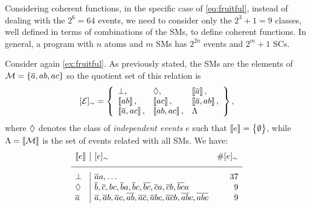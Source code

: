 \documentclass[x11names]{tlp}
\begin{document}
Considering coherent functions, in the specific case of \cref{eq:fruitful},
instead of dealing with the $2^6 = 64$ events, we need to consider only the
$2^3 + 1 = 9$ classes, well defined in terms of combinations of the
\aclp{SM}, to define coherent functions. In general, a program with $n$ atoms
and $m$ \aclp{SM} has $2^{2n}$ events and $2^m + 1$ \aclp{SC}.

\ifExamples
	\begin{example}\label{ex:classes}\em

		Consider again \cref{ex:fruitful}. As previously stated, the \aclp{SM} are
		the elements of $\MODELset = \set{\co{a}, ab, ac}$ so the quotient set of
		this relation is
		\begin{equation*}
			\class{\EVENTSset} = \set{
				\begin{array}{lll}
					\inconsistent,           &
					\indepclass,             &
					\stablecore{\co{a}},%
					\\
					\stablecore{ab},         &
					\stablecore{ac},         &
					\stablecore{\co{a}, ab},%
					\\
					\stablecore{\co{a}, ac}, &
					\stablecore{ab, ac},     &
					\consequenceclass
				\end{array}
			},
		\end{equation*}
		where $\Diamond$ denotes the class of \emph{independent
			events} $e$ such that $\left\llbracket e \right\rrbracket = \set{\emptyset}$,
		while $\consequenceclass = \stablecore{\MODELset}$ is the set of
		events related with all \acp{SM}.  We have:
		\begin{equation*}
			\begin{array}{l|lr}
				\stablecore{e}
				       & \class{e}
				       & \# \class{e}                                                                           %
				\\
				\hline
				\inconsistent
				       & \co{a}a, \ldots
				       & 37                                                                                     %
				\\
				\indepclass
				       & \co{b}, \co{c}, bc, \co{b}a, \co{b}c, \co{bc}, \co{c}a, \co{c}b, \co{bc}a
				       & 9                                                                                      %
				\\
				\co{a}
				       & \co{a}, \co{a}b, \co{a}c, \co{ab}, \co{ac}, \co{a}bc, \co{ac}b, \co{ab}c, \co{abc}
				       & 9                                                                                      %
				\\

\end{array}
\end{equation*}
\end{example}
\end{document}
